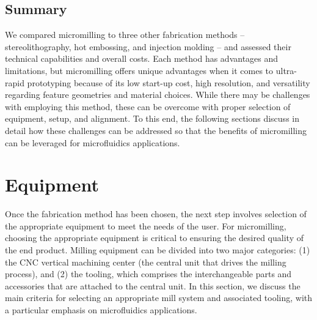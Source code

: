 \subsection{Summary}
We compared micromilling to three other fabrication methods -- stereolithography, hot embossing, and injection molding -- and assessed their technical capabilities and overall costs. Each method has advantages and limitations, but micromilling offers unique advantages when it comes to ultra-rapid prototyping because of its low start-up cost, high resolution, and versatility regarding feature geometries and material choices. While there may be challenges with employing this method, these can be overcome with proper selection of equipment, setup, and alignment. To this end, the following sections discuss in detail how these challenges can be addressed so that the benefits of micromilling can be leveraged for microfluidics applications.


\section{Equipment}
Once the fabrication method has been chosen, the next step involves selection of the appropriate equipment to meet the needs of the user. For micromilling, choosing the appropriate equipment is critical to ensuring the desired quality of the end product. Milling equipment can be divided into two major categories: (1) the CNC vertical machining center (the central unit that drives the milling process), and (2) the tooling, which comprises the interchangeable parts and accessories that are attached to the central unit. In this section, we discuss the main criteria for selecting an appropriate mill system and associated tooling, with a particular emphasis on microfluidics applications.


